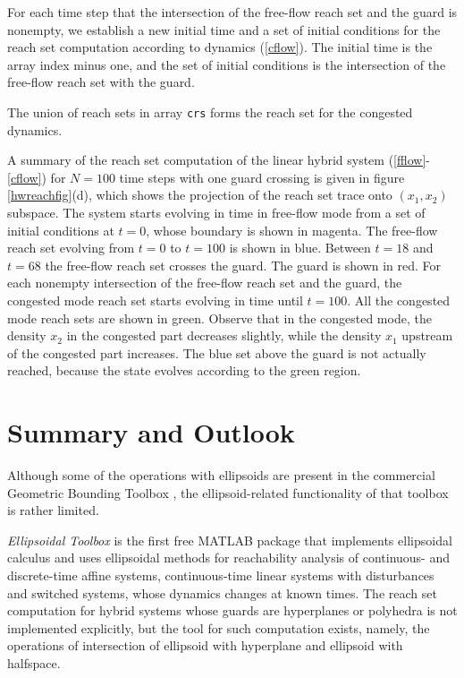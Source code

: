 \documentclass{report}
\begin{document}
For each time step that the intersection of the free-flow reach set and the
guard is nonempty, we establish a new initial time and a set of initial
conditions for the reach set computation according to dynamics (\ref{cflow}).
The initial time is the array index minus one, and the set of initial
conditions is the intersection of the free-flow reach set with the guard.

The union of reach sets in array {\tt crs} forms the reach set for
the congested dynamics.

A summary of
 the reach set computation of the
linear hybrid system (\ref{fflow}-\ref{cflow}) for $N=100$ time steps
with one guard crossing is given in figure \ref{hwreachfig}(d),
which shows the projection of the reach set trace onto $(x_1,x_2)$ subspace.
The system starts evolving in time in free-flow mode from a set of
initial conditions at $t=0$, whose boundary is shown in magenta.
The free-flow reach set evolving from $t=0$ to $t=100$ is shown in blue.
Between  $t=18$ and $t=68$ the free-flow reach set crosses the guard.
The guard is shown in red.
For each  nonempty intersection of the free-flow reach set and the guard,
the congested mode reach set starts evolving in time until $t=100$.
All the congested mode reach sets are shown in green.
Observe that in the congested mode, the density $x_2$ in the congested part
 decreases slightly, while the density $x_1$ upstream of the congested part
 increases.
The blue  set above the guard is not actually reached,
because the state evolves according to the green region.





\chapter{Summary and Outlook}
Although some of the operations with ellipsoids are present in the
commercial Geometric Bounding Toolbox \cite{gbt1, gbt2}, the
ellipsoid-related functionality of that toolbox is rather limited.

{\it Ellipsoidal Toolbox} is the first free MATLAB package that
implements ellipsoidal calculus and uses ellipsoidal methods
for reachability analysis of continuous- and discrete-time affine
systems, continuous-time linear systems with disturbances and switched
systems, whose dynamics changes at known times.
The reach set computation for hybrid systems whose guards are hyperplanes
or polyhedra is not implemented explicitly, but the tool for such computation
exists, namely, the operations of intersection of ellipsoid with hyperplane
and ellipsoid with halfspace.
\end{document}
